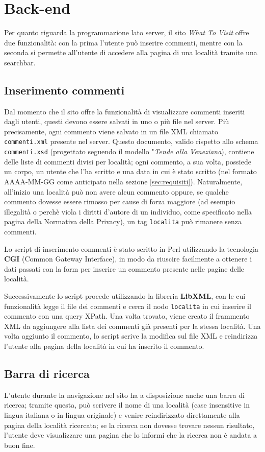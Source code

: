 \section{Back-end}
Per quanto riguarda la programmazione lato server, il sito \textit{What To
Visit} offre due funzionalità: con la prima l'utente può inserire commenti,
mentre con la seconda si permette all'utente di accedere alla pagina di una
località tramite una searchbar.

\subsection{Inserimento commenti}
Dal momento che il sito offre la funzionalità di visualizzare commenti inseriti
dagli utenti, questi devono essere salvati in uno o più file nel server. Più
precisamente, ogni commento viene salvato in un file XML chiamato
\texttt{commenti.xml} presente nel server.
Questo documento, valido rispetto allo schema \texttt{commenti.xsd}
(progettato seguendo il modello "\textit{Tende alla Veneziana}), contiene
delle liste di commenti divisi per località; ogni commento, a sua volta,
possiede un corpo, un utente che l'ha scritto e una data in cui è stato
scritto (nel formato AAAA-MM-GG come anticipato nella sezione
\ref{sec:requisiti}). Naturalmente, all'inizio una località può non avere
alcun commento oppure, se qualche commento dovesse essere rimosso per cause di
forza maggiore (ad esempio illegalità o perchè viola i diritti d'autore di un
individuo, come specificato nella pagina della Normativa della Privacy), un
tag \texttt{localita} può rimanere senza commenti.

Lo script di inserimento commenti è stato scritto in Perl utilizzando la
tecnologia \textbf{CGI} (Common Gateway Interface), in modo da riuscire
facilmente a ottenere i dati passati con la form per inserire un commento
presente nelle pagine delle località.

Successivamente lo script procede utilizzando la libreria \textbf{LibXML}, con
le cui funzionalità legge il file dei commenti e cerca il nodo
\texttt{localita} in cui inserire il commento con una query XPath.
Una volta trovato, viene creato il frammento XML da aggiungere alla lista dei
commenti già presenti per la stessa località. Una volta aggiunto il commento,
lo script scrive la modifica sul file XML e reindirizza l'utente alla pagina
della località in cui ha inserito il commento.

\subsection{Barra di ricerca}
L'utente durante la navigazione nel sito ha a disposizione anche una barra di
ricerca; tramite questa, può scrivere il nome di una località (case
insensitive in lingua italiana o in lingua originale) e venire reindirizzato
direttamente alla pagina della località ricercata; se la ricerca non dovesse
trovare nessun risultato, l'utente deve visualizzare una pagina che lo informi
che la ricerca non è andata a buon fine.

